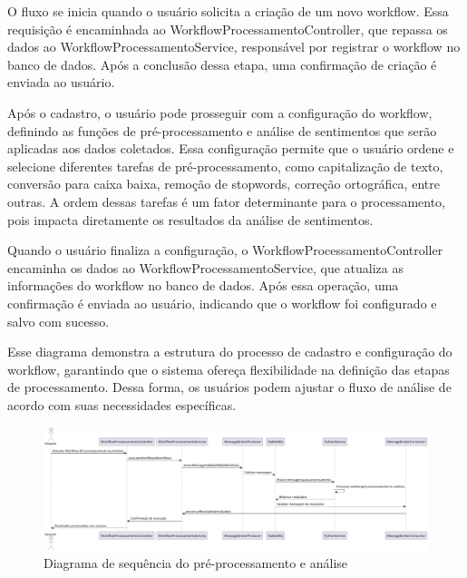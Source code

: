 \documentclass[
	12pt,				%
	oneside,			%
	a4paper,			%
	english,			%
	french,				%
	spanish,			%
	brazil				%
	]{abntex2}
\begin{document}
O fluxo se inicia quando o usuário solicita a criação de um novo
workflow. Essa requisição é encaminhada ao
WorkflowProcessamentoController, que repassa os dados ao
WorkflowProcessamentoService, responsável por registrar o workflow no
banco de dados. Após a conclusão dessa etapa, uma confirmação de criação
é enviada ao usuário.

Após o cadastro, o usuário pode prosseguir com a configuração do
workflow, definindo as funções de pré-processamento e análise de
sentimentos que serão aplicadas aos dados coletados. Essa configuração
permite que o usuário ordene e selecione diferentes tarefas de
pré-processamento, como capitalização de texto, conversão para caixa
baixa, remoção de stopwords, correção ortográfica, entre outras. A ordem
dessas tarefas é um fator determinante para o processamento, pois
impacta diretamente os resultados da análise de sentimentos.

Quando o usuário finaliza a configuração, o
WorkflowProcessamentoController encaminha os dados ao
WorkflowProcessamentoService, que atualiza as informações do workflow no
banco de dados. Após essa operação, uma confirmação é enviada ao
usuário, indicando que o workflow foi configurado e salvo com sucesso.

Esse diagrama demonstra a estrutura do processo de cadastro e
configuração do workflow, garantindo que o sistema ofereça flexibilidade
na definição das etapas de processamento. Dessa forma, os usuários podem
ajustar o fluxo de análise de acordo com suas necessidades específicas.

\begin{figure}[htbp]
\hypertarget{seq_processamento_analise}{%
\caption{Diagrama de sequência do pré-processamento e análise}\label{seq_processamento_analise}
\begin{center}
\includegraphics[scale=0.2]{imagens/sentilytics/diagramas/sequencia-pre-processamento-analise-sentimentos.png}
\end{center}
}
\end{figure}
\end{document}
